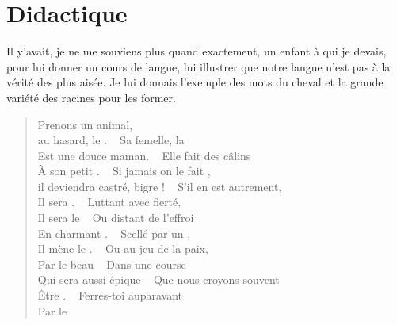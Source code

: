 \section*{Didactique}

\begin{prose}
Il y’avait, je ne me souviens plus quand exactement, un enfant à qui je devais, pour lui donner un cours de langue, lui illustrer que notre langue n’est pas à la vérité des plus aisée. Je lui donnais l’exemple des mots du cheval et la grande variété des racines pour les former.
\end{prose}


\begin{verse}
Prenons un animal,\\
au hasard, le .
~
Sa femelle, la \\
Est une douce maman.
~
Elle fait des câlins\\
À son petit .
~
Si jamais on le fait ,\\
il deviendra castré, bigre !
~
S’il en est autrement,\\
Il sera .
~
Luttant avec fierté,\\
Il sera le 
~
Ou distant de l’effroi\\
En charmant .
~
Scellé par un ,\\
Il mène le .
~
Ou au jeu de la paix,\\
Par le beau 
~
Dans une course \\
Qui sera aussi épique
~
Que nous croyons souvent\\
Être .
~
Ferres-toi auparavant\\
Par le 
\end{verse}




